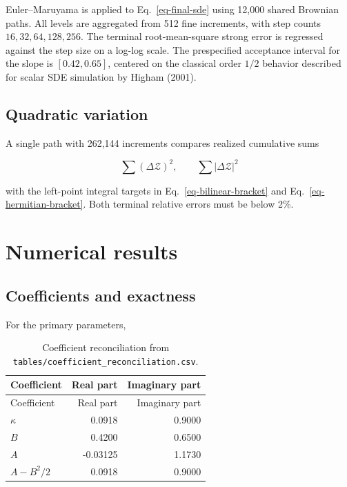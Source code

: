 \documentclass[
  english,
  10pt,
  letterpaper,
  DIV=11,
  numbers=noendperiod]{scrartcl}
\begin{document}
Euler--Maruyama is applied to Eq.~\ref{eq-final-sde} using 12,000 shared
Brownian paths. All levels are aggregated from 512 fine increments, with
step counts \(16,32,64,128,256\). The terminal root-mean-square strong
error is regressed against the step size on a log-log scale. The
prespecified acceptance interval for the slope is \([0.42,0.65]\),
centered on the classical order \(1/2\) behavior described for scalar
SDE simulation by Higham (2001).

\subsection{Quadratic variation}\label{quadratic-variation}

A single path with 262,144 increments compares realized cumulative sums

\[
\sum(\Delta\mathcal Z)^2,\qquad
\sum|\Delta\mathcal Z|^2
\]

with the left-point integral targets in Eq.~\ref{eq-bilinear-bracket}
and Eq.~\ref{eq-hermitian-bracket}. Both terminal relative errors must
be below 2\%.

\section{Numerical results}\label{sec-results}

\subsection{Coefficients and
exactness}\label{coefficients-and-exactness}

For the primary parameters,

\begin{longtable}[]{@{}lrr@{}}
\caption{Coefficient reconciliation from
\protect\texttt{tables/coefficient\_reconciliation.csv}.}\label{tbl-coefficients}\tabularnewline
\toprule\noalign{}
Coefficient & Real part & Imaginary part \\
\midrule\noalign{}
\endfirsthead
\toprule\noalign{}
Coefficient & Real part & Imaginary part \\
\midrule\noalign{}
\endhead
\bottomrule\noalign{}
\endlastfoot
\(\kappa\) & 0.0918 & 0.9000 \\
\(B\) & 0.4200 & 0.6500 \\
\(A\) & -0.03125 & 1.1730 \\
\(A-B^2/2\) & 0.0918 & 0.9000 \\
\end{longtable}
\end{document}
